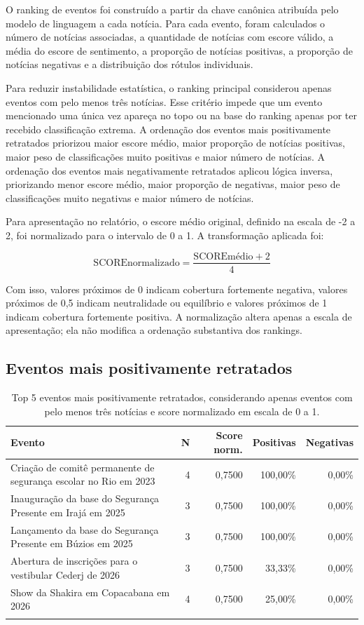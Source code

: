 \documentclass[12pt,a4paper]{article}
\begin{document}
O ranking de eventos foi construído a partir da chave canônica atribuída pelo modelo de linguagem a cada notícia. Para cada evento, foram calculados o número de notícias associadas, a quantidade de notícias com escore válido, a média do escore de sentimento, a proporção de notícias positivas, a proporção de notícias negativas e a distribuição dos rótulos individuais.

Para reduzir instabilidade estatística, o ranking principal considerou apenas eventos com pelo menos três notícias. Esse critério impede que um evento mencionado uma única vez apareça no topo ou na base do ranking apenas por ter recebido classificação extrema. A ordenação dos eventos mais positivamente retratados priorizou maior escore médio, maior proporção de notícias positivas, maior peso de classificações muito positivas e maior número de notícias. A ordenação dos eventos mais negativamente retratados aplicou lógica inversa, priorizando menor escore médio, maior proporção de negativas, maior peso de classificações muito negativas e maior número de notícias.

Para apresentação no relatório, o escore médio original, definido na escala de -2 a 2, foi normalizado para o intervalo de 0 a 1. A transformação aplicada foi:

\[
\text{SCOREnormalizado} = \frac{\text{SCOREmédio} + 2}{4}
\]

Com isso, valores próximos de 0 indicam cobertura fortemente negativa, valores próximos de 0,5 indicam neutralidade ou equilíbrio e valores próximos de 1 indicam cobertura fortemente positiva. A normalização altera apenas a escala de apresentação; ela não modifica a ordenação substantiva dos rankings.

\subsection{Eventos mais positivamente retratados}

\begin{longtable}{p{7.2cm}rrrr}
\toprule
\textbf{Evento} & \textbf{N} & \textbf{Score norm.} & \textbf{Positivas} & \textbf{Negativas} \\
\midrule
\endhead
Criação de comitê permanente de segurança escolar no Rio em 2023 & 4 & 0,7500 & 100,00\% & 0,00\% \\
Inauguração da base do Segurança Presente em Irajá em 2025 & 3 & 0,7500 & 100,00\% & 0,00\% \\
Lançamento da base do Segurança Presente em Búzios em 2025 & 3 & 0,7500 & 100,00\% & 0,00\% \\
Abertura de inscrições para o vestibular Cederj de 2026 & 3 & 0,7500 & 33,33\% & 0,00\% \\
Show da Shakira em Copacabana em 2026 & 4 & 0,7500 & 25,00\% & 0,00\% \\
\bottomrule
\caption{Top 5 eventos mais positivamente retratados, considerando apenas eventos com pelo menos três notícias e score normalizado em escala de 0 a 1.}
\end{longtable}
\end{document}
